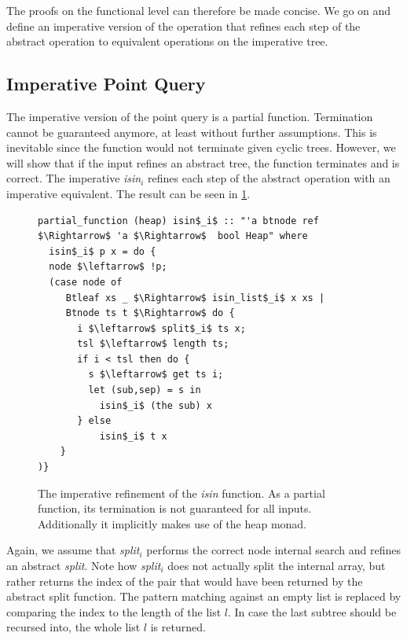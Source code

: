 \documentclass[runningheads]{llncs}
\begin{document}
The proofs on the functional level can therefore be made concise.
We go on and define an imperative version of the operation that
refines each step of the abstract operation to equivalent operations on the imperative tree.

\subsection{Imperative Point Query}
\label{sec:imperative_pq}

The imperative version of the point query is a partial function.
Termination cannot be guaranteed anymore,
at least without further assumptions.
This is inevitable since the function would not terminate
given cyclic trees.
However, we will show that if the input refines an abstract tree,
the function terminates and is correct.
The imperative \emph{isin$_i$} refines each step of the abstract
operation with an imperative equivalent.
The result can be seen in \cref{fig:isin-imp-def}.

\begin{figure}
    \centering
\begin{lstlisting}[mathescape=true, language=Isabelle,label=lst:isin-imp-def]
partial_function (heap) isin$_i$ :: "'a btnode ref $\Rightarrow$ 'a $\Rightarrow$  bool Heap" where
  isin$_i$ p x = do {
  node $\leftarrow$ !p;
  (case node of
     Btleaf xs _ $\Rightarrow$ isin_list$_i$ x xs |
     Btnode ts t $\Rightarrow$ do {
       i $\leftarrow$ split$_i$ ts x;
       tsl $\leftarrow$ length ts;
       if i < tsl then do {
         s $\leftarrow$ get ts i;
         let (sub,sep) = s in
           isin$_i$ (the sub) x
       } else
           isin$_i$ t x
    }
)}
\end{lstlisting}
\caption[Definition of \emph{isin$_i$}]{
    The imperative refinement of the \emph{isin} function.
    As a partial function, its termination is not guaranteed for all inputs.
    Additionally it implicitly makes use of the heap monad.
}
\label{fig:isin-imp-def}
\end{figure}

Again, we assume that \emph{split$_i$} performs the correct node internal search
and refines an abstract \emph{split}.
Note how \emph{split$_i$} does not actually split
the internal array, but rather returns the index of the pair
that would have been returned by the abstract split function.
The pattern matching against an empty list
is replaced by comparing the index to the length of the list $l$.
In case the last subtree should be recursed into, the whole list $l$ is returned.
\end{document}
